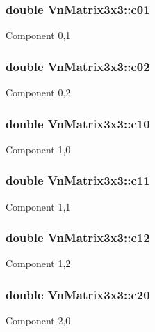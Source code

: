 \subsubsection[{\texorpdfstring{c01}{c01}}]{\setlength{\rightskip}{0pt plus 5cm}double Vn\+Matrix3x3\+::c01}\hypertarget{structVnMatrix3x3_a8fc44602ef4388cf97ee897e4247f848}{}\label{structVnMatrix3x3_a8fc44602ef4388cf97ee897e4247f848}
Component 0,1 
\subsubsection[{\texorpdfstring{c02}{c02}}]{\setlength{\rightskip}{0pt plus 5cm}double Vn\+Matrix3x3\+::c02}\hypertarget{structVnMatrix3x3_aaa144d01b70e661ee1acd830542a0a36}{}\label{structVnMatrix3x3_aaa144d01b70e661ee1acd830542a0a36}
Component 0,2 
\subsubsection[{\texorpdfstring{c10}{c10}}]{\setlength{\rightskip}{0pt plus 5cm}double Vn\+Matrix3x3\+::c10}\hypertarget{structVnMatrix3x3_ad9ea62284227b7faf9e0d4de35ac0ae7}{}\label{structVnMatrix3x3_ad9ea62284227b7faf9e0d4de35ac0ae7}
Component 1,0 
\subsubsection[{\texorpdfstring{c11}{c11}}]{\setlength{\rightskip}{0pt plus 5cm}double Vn\+Matrix3x3\+::c11}\hypertarget{structVnMatrix3x3_a4a8bfcb11d1e4dc546979b939cdd4710}{}\label{structVnMatrix3x3_a4a8bfcb11d1e4dc546979b939cdd4710}
Component 1,1 
\subsubsection[{\texorpdfstring{c12}{c12}}]{\setlength{\rightskip}{0pt plus 5cm}double Vn\+Matrix3x3\+::c12}\hypertarget{structVnMatrix3x3_a094f0e355595700cfcceb78cd05e8ddc}{}\label{structVnMatrix3x3_a094f0e355595700cfcceb78cd05e8ddc}
Component 1,2 
\subsubsection[{\texorpdfstring{c20}{c20}}]{\setlength{\rightskip}{0pt plus 5cm}double Vn\+Matrix3x3\+::c20}\hypertarget{structVnMatrix3x3_ac157bda2efa69aab231a6c06443ba898}{}\label{structVnMatrix3x3_ac157bda2efa69aab231a6c06443ba898}
Component 2,0 
